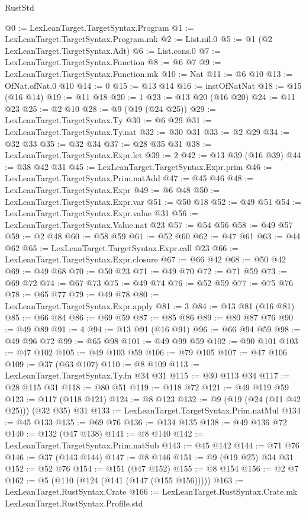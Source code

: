 \begin{lexlean}{RustStd}
\begin{coremodule}
@0 := LexLeanTarget.TargetSyntax.Program
@1 := LexLeanTarget.TargetSyntax.Program.mk
@2 := List.nil.{0}
@5 := @1 (@2 LexLeanTarget.TargetSyntax.Adt)
@6 := List.cons.{0}
@7 := LexLeanTarget.TargetSyntax.Function
@8 := @6 @7
@9 := LexLeanTarget.TargetSyntax.Function.mk
@10 := Nat
@11 := @6 @10
@13 := OfNat.ofNat.{0} @10
@14 := 0
@15 := @13 @14
@16 := instOfNatNat
@18 := @15 (@16 @14)
@19 := @11 @18
@20 := 1
@23 := @13 @20 (@16 @20)
@24 := @11 @23
@25 := @2 @10
@28 := @9 (@19 (@24 @25))
@29 := LexLeanTarget.TargetSyntax.Ty
@30 := @6 @29
@31 := LexLeanTarget.TargetSyntax.Ty.nat
@32 := @30 @31
@33 := @2 @29
@34 := @32 @33
@35 := @32 @34
@37 := @28 @35 @31
@38 := LexLeanTarget.TargetSyntax.Expr.let
@39 := 2
@42 := @13 @39 (@16 @39)
@44 := @38 @42 @31
@45 := LexLeanTarget.TargetSyntax.Expr.prim
@46 := LexLeanTarget.TargetSyntax.Prim.natAdd
@47 := @45 @46
@48 := LexLeanTarget.TargetSyntax.Expr
@49 := @6 @48
@50 := LexLeanTarget.TargetSyntax.Expr.var
@51 := @50 @18
@52 := @49 @51
@54 := LexLeanTarget.TargetSyntax.Expr.value @31
@56 := LexLeanTarget.TargetSyntax.Value.nat @23
@57 := @54 @56
@58 := @49 @57
@59 := @2 @48
@60 := @58 @59
@61 := @52 @60
@62 := @47 @61
@63 := @44 @62
@65 := LexLeanTarget.TargetSyntax.Expr.call @23
@66 := LexLeanTarget.TargetSyntax.Expr.closure
@67 := @66 @42
@68 := @50 @42
@69 := @49 @68
@70 := @50 @23
@71 := @49 @70
@72 := @71 @59
@73 := @69 @72
@74 := @67 @73
@75 := @49 @74
@76 := @52 @59
@77 := @75 @76
@78 := @65 @77
@79 := @49 @78
@80 := LexLeanTarget.TargetSyntax.Expr.apply
@81 := 3
@84 := @13 @81 (@16 @81)
@85 := @66 @84
@86 := @69 @59
@87 := @85 @86
@89 := @80 @87 @76
@90 := @49 @89
@91 := 4
@94 := @13 @91 (@16 @91)
@96 := @66 @94 @59
@98 := @49 @96 @72
@99 := @65 @98
@101 := @49 @99 @59
@102 := @90 @101
@103 := @47 @102
@105 := @49 @103 @59
@106 := @79 @105
@107 := @47 @106
@109 := @37 (@63 @107)
@110 := @8 @109
@113 := LexLeanTarget.TargetSyntax.Ty.fn @34 @31
@115 := @30 @113 @34
@117 := @28 @115 @31
@118 := @80 @51
@119 := @118 @72
@121 := @49 @119 @59
@123 := @117 (@118 @121)
@124 := @8 @123
@132 := @9 (@19 (@24 (@11 @42 @25))) (@32 @35) @31
@133 := LexLeanTarget.TargetSyntax.Prim.natMul
@134 := @45 @133
@135 := @69 @76
@136 := @134 @135
@138 := @49 @136 @72
@140 := @132 (@47 @138)
@141 := @8 @140
@142 := LexLeanTarget.TargetSyntax.Prim.natSub
@143 := @45 @142
@144 := @71 @76
@146 := @37 (@143 @144)
@147 := @8 @146
@151 := @9 (@19 @25) @34 @31
@152 := @52 @76
@154 := @151 (@47 @152)
@155 := @8 @154
@156 := @2 @7
@162 := @5 (@110 (@124 (@141 (@147 (@155 @156)))))
@163 := LexLeanTarget.RustSyntax.Crate
@166 := LexLeanTarget.RustSyntax.Crate.mk LexLeanTarget.RustSyntax.Profile.std

\end{coremodule}
\end{lexlean}
